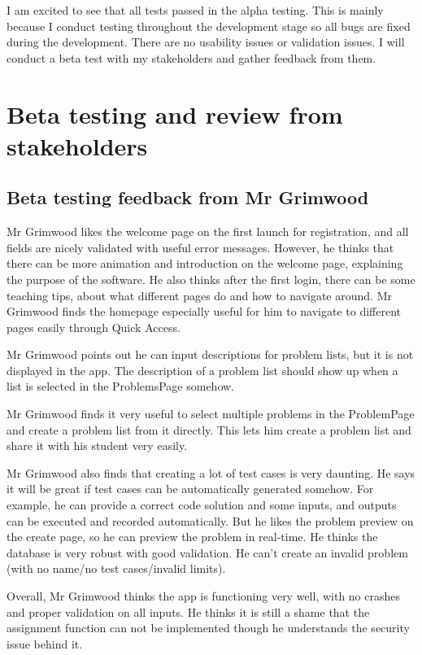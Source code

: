\documentclass[report.tex]{subfiles}
\begin{document}
I am excited to see that all tests passed in the alpha testing. This is mainly because I conduct testing throughout the development stage so all bugs are fixed during the development. There are no usability issues or validation issues. I will conduct a beta test with my stakeholders and gather feedback from them.

\section{Beta testing and review from stakeholders}

\subsection{Beta testing feedback from Mr Grimwood}

Mr Grimwood likes the welcome page on the first launch for registration, and all fields are nicely validated with useful error messages. However, he thinks that there can be more animation and introduction on the welcome page, explaining the purpose of the software. He also thinks after the first login, there can be some teaching tips, about what different pages do and how to navigate around. Mr Grimwood finds the homepage especially useful for him to navigate to different pages easily through Quick Access.

Mr Grimwood points out he can input descriptions for problem lists, but it is not displayed in the app. The description of a problem list should show up when a list is selected in the ProblemsPage somehow.

Mr Grimwood finds it very useful to select multiple problems in the ProblemPage and create a problem list from it directly. This lets him create a problem list and share it with his student very easily.

Mr Grimwood also finds that creating a lot of test cases is very daunting. He says it will be great if test cases can be automatically generated somehow. For example, he can provide a correct code solution and some inputs, and outputs can be executed and recorded automatically. But he likes the problem preview on the create page, so he can preview the problem in real-time. He thinks the database is very robust with good validation. He can't create an invalid problem (with no name/no test cases/invalid limits).

Overall, Mr Grimwood thinks the app is functioning very well, with no crashes and proper validation on all inputs. He thinks it is still a shame that the assignment function can not be implemented though he understands the security issue behind it.
\end{document}
